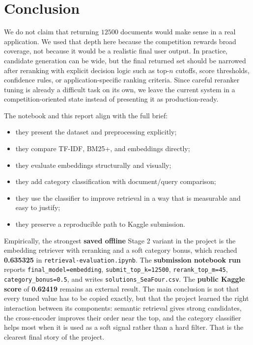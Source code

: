 \documentclass[11pt,a4paper]{article}
\begin{document}
\section{Conclusion}

We do not claim that returning \(12500\) documents would make sense in a real application. We used that depth here because the competition rewards broad coverage, not because it would be a realistic final user output. In practice, candidate generation can be wide, but the final returned set should be narrowed after reranking with explicit decision logic such as top-\(n\) cutoffs, score thresholds, confidence rules, or application-specific ranking criteria. Since careful reranker tuning is already a difficult task on its own, we leave the current system in a competition-oriented state instead of presenting it as production-ready.

The notebook and this report align with the full brief:
\begin{itemize}
    \item they present the dataset and preprocessing explicitly;
    \item they compare TF-IDF, BM25+, and embeddings directly;
    \item they evaluate embeddings structurally and visually;
    \item they add category classification with document/query comparison;
    \item they use the classifier to improve retrieval in a way that is measurable and easy to justify;
    \item they preserve a reproducible path to Kaggle submission.
\end{itemize}

Empirically, the strongest \textbf{saved offline} Stage 2 variant in the project is the embedding retriever with reranking and a soft category bonus, which reached \textbf{0.635325} in \texttt{retrieval-evaluation.ipynb}. The \textbf{submission notebook run} reports \texttt{final\_model=embedding}, \texttt{submit\_top\_k=12500}, \texttt{rerank\_top\_m=45}, \texttt{category\_bonus=0.5}, and writes \texttt{solutions\_SeaFour.csv}. The \textbf{public Kaggle score} of \textbf{0.62419} remains an external result. The main conclusion is not that every tuned value has to be copied exactly, but that the project learned the right interaction between its components: semantic retrieval gives strong candidates, the cross-encoder improves their order near the top, and the category classifier helps most when it is used as a soft signal rather than a hard filter. That is the clearest final story of the project.
\end{document}
